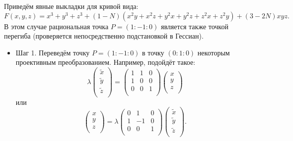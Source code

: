 \documentclass[a4paper,12pt]{article}
\theoremstyle{definition}
\begin{document}
    Приведём явные выкладки для кривой вида:
    \[
    F(x, y, z) = x^3 + y^3 + z^3 + (1 - N) (x^2 y + x^2 z + y^2 x + y^2 z + z^2 x + z^2 y) +
    (3 - 2 N) x y z 
    .\] 
    В этом случае рациональная точка \(P = (1 : -1 : 0)\) является также точкой перегиба
    (проверяется непосредственно подстановкой в Гессиан).

    \begin{itemize}[leftmargin=0.6cm]
        \item Шаг 1. Переведём точку \(P = (1 : -1 : 0)\) в точку
        \((0 : 1 : 0)\) некоторым проективным преобразованием. Например,
        подойдёт такое:
        \[
        \lambda
        \begin{pmatrix}
            \widetilde{x} \\
            \widetilde{y} \\
            \widetilde{z} \\
        \end{pmatrix} 
        = 
        \begin{pmatrix}
            1 & 1 & 0 \\
            1 & 0 & 0 \\
            0 & 0 & 1 \\
        \end{pmatrix}
        \begin{pmatrix}
            x \\
            y \\
            z \\
        \end{pmatrix}
        \]
        или
        \[
        \begin{pmatrix}
            x \\
            y \\
            z \\
        \end{pmatrix} =
        \lambda
        \begin{pmatrix}
            0 & 1 & 0 \\
            1 & -1 & 0 \\
            0 & 0 & 1 \\
        \end{pmatrix}
        \begin{pmatrix}
            \widetilde{x} \\
            \widetilde{y} \\
            \widetilde{z} \\
        \end{pmatrix} 
        .\] 
        


\end{itemize}
\end{document}

